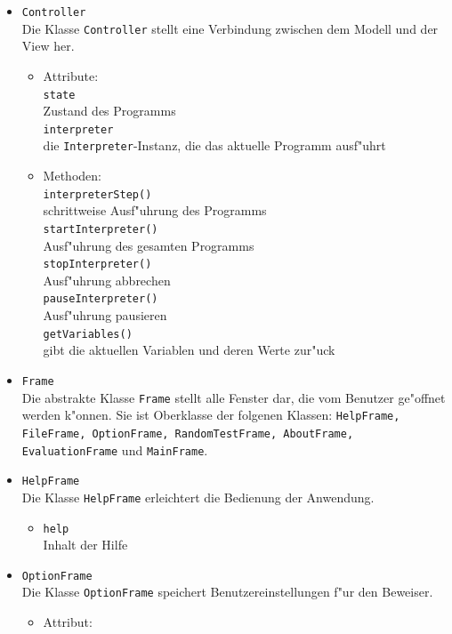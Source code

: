 \documentclass[10pt,a4paper,titlepage]{article}
\begin{document}
\begin{itemize}
\item \texttt{Controller} \\
Die Klasse \texttt{Controller} stellt eine Verbindung zwischen dem Modell und der View her. 
\begin{itemize}
\item Attribute: \\
\texttt{state} \\
Zustand des Programms \\
\texttt{interpreter} \\
die \texttt{Interpreter}-Instanz, die das aktuelle Programm ausf"uhrt 
\item Methoden: \\
\texttt{interpreterStep()} \\
schrittweise Ausf"uhrung des Programms \\
\texttt{startInterpreter()} \\
Ausf"uhrung des gesamten Programms \\
\texttt{stopInterpreter()} \\
Ausf"uhrung abbrechen \\
\texttt{pauseInterpreter()} \\
Ausf"uhrung pausieren \\
\texttt{getVariables()} \\
gibt die aktuellen Variablen und deren Werte zur"uck 
\end{itemize}
\item \texttt{Frame} \\
Die abstrakte Klasse \texttt{Frame} stellt alle Fenster dar, die vom Benutzer ge"offnet werden k"onnen. Sie ist Oberklasse der folgenen Klassen: \texttt{HelpFrame, FileFrame, OptionFrame, RandomTestFrame, AboutFrame, EvaluationFrame} und \texttt{MainFrame}.
\item \texttt{HelpFrame} \\
Die Klasse \texttt{HelpFrame} erleichtert die Bedienung der Anwendung. 
\begin{itemize}
\item \texttt{help} \\
Inhalt der Hilfe 
\end{itemize}
\item \texttt{OptionFrame} \\
Die Klasse \texttt{OptionFrame} speichert Benutzereinstellungen f"ur den Beweiser. 
\begin{itemize}
\item Attribut: \\

\end{itemize}
\end{itemize}
\end{document}
